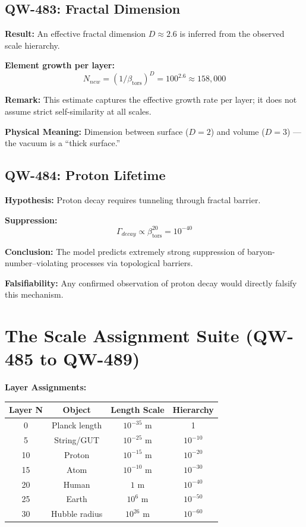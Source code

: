 \documentclass[11pt,a4paper]{book}
\theoremstyle{remark}
\newcommand{\betators}{\beta_{\text{tors}}}
\begin{document}
\subsection{QW-483: Fractal Dimension}

\textbf{Result:} An effective fractal dimension $D \approx 2.6$ is inferred from the observed scale hierarchy.

\textbf{Element growth per layer:}
\begin{equation}
N_{new} = (1/\betators)^D = 100^{2.6} \approx 158,000
\end{equation}

\textbf{Remark:} This estimate captures the effective growth rate per layer; it does not assume strict self-similarity at all scales.

\textbf{Physical Meaning:} Dimension between surface ($D = 2$) and volume ($D = 3$) --- the vacuum is a ``thick surface.''

\subsection{QW-484: Proton Lifetime}

\textbf{Hypothesis:} Proton decay requires tunneling through fractal barrier.

\textbf{Suppression:}
\begin{equation}
\Gamma_{decay} \propto \betators^{20} = 10^{-40}
\end{equation}

\textbf{Conclusion:} The model predicts extremely strong suppression of baryon-number--violating processes via topological barriers.

\textbf{Falsifiability:} Any confirmed observation of proton decay would directly falsify this mechanism.

\section{The Scale Assignment Suite (QW-485 to QW-489)}

\textbf{Layer Assignments:}

\begin{center}
\begin{tabular}{|c|c|c|c|}
\hline
\textbf{Layer N} & \textbf{Object} & \textbf{Length Scale} & \textbf{Hierarchy} \\
\hline
0 & Planck length & $10^{-35}$ m & 1 \\
5 & String/GUT & $10^{-25}$ m & $10^{-10}$ \\
10 & Proton & $10^{-15}$ m & $10^{-20}$ \\
15 & Atom & $10^{-10}$ m & $10^{-30}$ \\
20 & Human & $1$ m & $10^{-40}$ \\
25 & Earth & $10^{6}$ m & $10^{-50}$ \\
30 & Hubble radius & $10^{26}$ m & $10^{-60}$ \\
\hline
\end{tabular}
\end{center}
\end{document}
